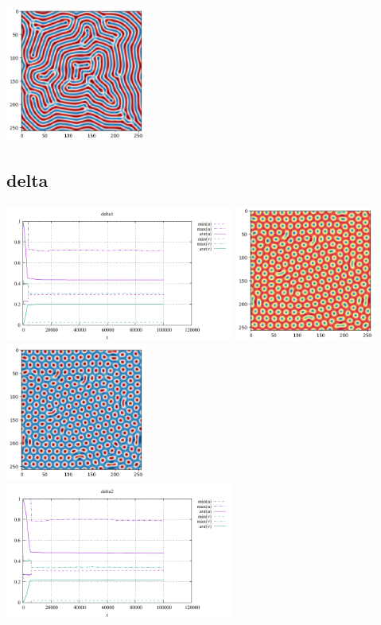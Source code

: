 \begin{center}
\includegraphics[height=4.5cm]{python_codes/fieldstone_171/results/gamma2_solution_final_v.png}
\end{center}

\subsection*{delta}
\begin{center}
\includegraphics[height=4.5cm]{python_codes/fieldstone_171/results/delta1_stats}
\includegraphics[height=4.5cm]{python_codes/fieldstone_171/results/delta1_solution_final_u.png}
\includegraphics[height=4.5cm]{python_codes/fieldstone_171/results/delta1_solution_final_v.png}\\
\includegraphics[height=4.5cm]{python_codes/fieldstone_171/results/delta2_stats}

\end{center}
